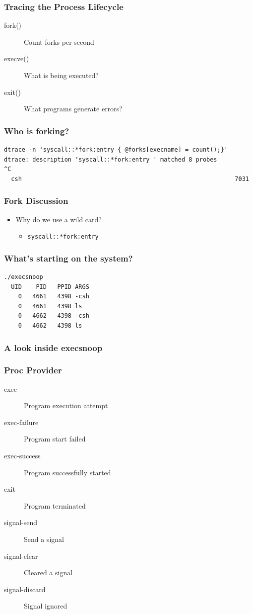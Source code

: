 \documentclass[pdftex]{beamer}
\begin{document}
\begin{frame}
  \frametitle{Tracing the Process Lifecycle}
  \begin{description}
  \item[fork()] Count forks per second
  \item[execve()] What is being executed?
  \item[exit()] What programs generate errors?
  \end{description}
\end{frame}

\begin{frame}[fragile]
  \frametitle{Who is forking?}
\begin{lstlisting}
dtrace -n 'syscall::*fork:entry { @forks[execname] = count();}'
dtrace: description 'syscall::*fork:entry ' matched 8 probes
^C
  csh                                                            7031
\end{lstlisting}
\end{frame}

\begin{frame}[fragile]
  \frametitle{Fork Discussion}
  \begin{itemize}
  \item Why do we use a wild card?
    \begin{itemize}
    \item \verb+syscall::*fork:entry+
    \end{itemize}
  \end{itemize}
\end{frame}


\begin{frame}[fragile]
  \frametitle{What's starting on the system?}
\begin{lstlisting}
./execsnoop 
  UID    PID   PPID ARGS
    0   4661   4398 -csh
    0   4661   4398 ls
    0   4662   4398 -csh
    0   4662   4398 ls
\end{lstlisting}
\end{frame}

\begin{frame}[fragile]
  \frametitle{A look inside execsnoop}

\end{frame}

\begin{frame}
  \frametitle{Proc Provider}
  \begin{description}
  \item[exec] Program execution attempt
  \item[exec-failure] Program start failed
  \item[exec-success] Program successfully started
  \item[exit] Program terminated
  \item[signal-send] Send a signal
  \item[signal-clear] Cleared a signal
  \item[signal-discard] Signal ignored
  \end{description}
\end{frame}
\end{document}
